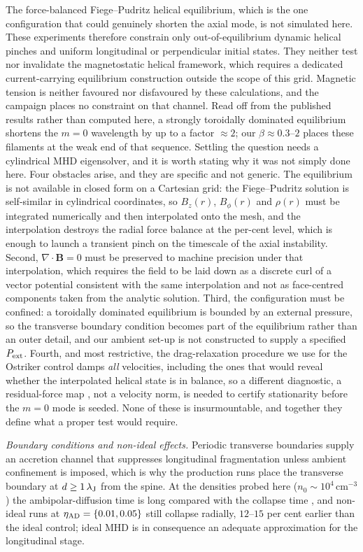 \documentclass[usenatbib,twoside,twocolumn]{mnras}
\begin{document}
The force-balanced Fiege--Pudritz helical equilibrium, which is the one configuration that could genuinely shorten the axial mode, is not simulated here. These experiments therefore constrain only out-of-equilibrium dynamic helical pinches and uniform longitudinal or perpendicular initial states. They neither test nor invalidate the magnetostatic helical framework, which requires a dedicated current-carrying equilibrium construction outside the scope of this grid. Magnetic tension is neither favoured nor disfavoured by these calculations, and the campaign places no constraint on that channel. Read off from the published \citet{Fiege2000} results rather than computed here, a strongly toroidally dominated equilibrium shortens the $m=0$ wavelength by up to a factor $\approx2$; our $\beta\approx0.3$--$2$ places these filaments at the weak end of that sequence. Settling the question needs a cylindrical MHD eigensolver, and it is worth stating why it was not simply done here. Four obstacles arise, and they are specific  and not generic. The equilibrium is not available in closed form on a Cartesian grid: the Fiege--Pudritz solution is self-similar in cylindrical coordinates, so $B_z(r)$, $B_\phi(r)$ and $\rho(r)$ must be integrated numerically and then interpolated onto the mesh, and the interpolation destroys the radial force balance at the per-cent level, which is enough to launch a transient pinch on the timescale of the axial instability. Second, $\nabla\!\cdot\!\mathbf{B}=0$ must be preserved to machine precision under that interpolation, which requires the field to be laid down as a discrete curl of a vector potential consistent with the same interpolation and not as face-centred components taken from the analytic solution. Third, the configuration must be confined: a toroidally dominated equilibrium is bounded by an external pressure, so the transverse boundary condition becomes part of the equilibrium rather than an outer detail, and our ambient set-up is not constructed to supply a specified $P_{\rm ext}$. Fourth, and most restrictive, the drag-relaxation procedure we use for the Ostriker control damps \emph{all} velocities, including the ones that would reveal whether the interpolated helical state is in balance, so a different diagnostic, a residual-force map , not a velocity norm, is needed to certify stationarity before the $m=0$ mode is seeded. None of these is insurmountable, and together they define what a proper test would require.

\emph{Boundary conditions and non-ideal effects.} Periodic transverse boundaries supply an accretion channel that suppresses longitudinal fragmentation unless ambient confinement is imposed, which is why the production runs place the transverse boundary at $d\geq1\,\lambda_{\rm J}$ from the spine. At the densities probed here ($n_0\sim10^4$\,cm$^{-3}$) the ambipolar-diffusion time is long compared with the collapse time \citep{Tassis2004}, and non-ideal runs at $\eta_{\rm AD}=\{0.01,0.05\}$ still collapse radially, $12$--$15$ per cent earlier than the ideal control; ideal MHD is in consequence an adequate approximation for the longitudinal stage.
\end{document}

